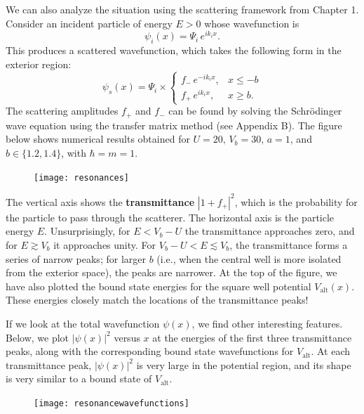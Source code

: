 \documentclass[pra,12pt]{revtex4}
\begin{document}
We can also analyze the situation using the scattering framework from
Chapter 1.  Consider an incident particle of energy $E > 0$ whose
wavefunction is
\begin{equation}
  \psi_i(x) = \Psi_i \, e^{ik_i x}.
\end{equation}
This produces a scattered wavefunction, which takes the following form
in the exterior region:
\begin{equation}
  \psi_s(x) = \Psi_i \times \begin{cases}f_- \,e^{-ik_ix}, & x \le -b \\ f_+ \,e^{ik_ix}, & x \ge b.\end{cases}
\end{equation}
The scattering amplitudes $f_+$ and $f_-$ can be found by solving the
Schr\"odinger wave equation using the transfer matrix method (see
Appendix B).  The figure below shows numerical results obtained for $U
= 20,\,V_b = 30,\,a=1$, and $b \in \{ 1.2, 1.4\}$, with $\hbar = m =
1$.

\begin{figure}[h]
  \centering\texttt{[image: resonances]}
\end{figure}

The vertical axis shows the \textbf{transmittance} $|1+f_+|^2$, which
is the probability for the particle to pass through the scatterer.
The horizontal axis is the particle energy $E$.  Unsurprisingly, for
$E < V_b-U$ the transmittance approaches zero, and for $E \gtrsim V_b$
it approaches unity.  For $V_b-U < E \lesssim V_b$, the transmittance
forms a series of narrow peaks; for larger $b$ (i.e., when the central
well is more isolated from the exterior space), the peaks are
narrower.  At the top of the figure, we have also plotted the bound
state energies for the square well potential $V_{\mathrm{alt}}(x)$.
These energies closely match the locations of the transmittance peaks!

If we look at the total wavefunction $\psi(x)$, we find other
interesting features.  Below, we plot $|\psi(x)|^2$ versus $x$ at the
energies of the first three transmittance peaks, along with the
corresponding bound state wavefunctions for $V_{\mathrm{alt}}$.  At
each transmittance peak, $|\psi(x)|^2$ is very large in the potential
region, and its shape is very similar to a bound state of
$V_{\mathrm{alt}}$.

\begin{figure}[h]
  \centering\texttt{[image: resonancewavefunctions]}
\end{figure}
\end{document}
